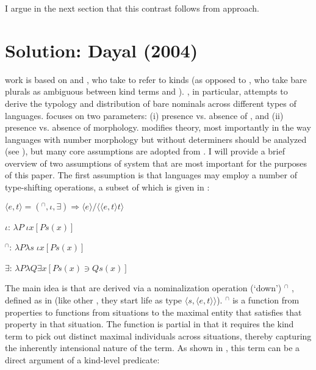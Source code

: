\documentclass[output=paper,
modfonts
]{langscibook}
\begin{document}
	I argue in the next section that this contrast follows from  approach.
	
	\section{Solution: Dayal (2004)} \label{sec:despic:3} 
	
	 work is based on \citet{Chierchia1998} and \citet{Carlson1977}, who take   to refer to kinds (as opposed to \citealt{Wilkinson1991, Diesing1992, KrifkaGerstnerLink1993, Kratzer1995}, who take bare plurals as ambiguous between kind terms and ). \citet{Chierchia1998}, in particular, attempts to derive the typology and distribution of bare nominals across different types of languages. \citet{Chierchia1998} focuses on two parameters: (i) presence vs. absence of , and (ii) presence vs. absence of  morphology. \citet{Dayal2004}
	modifies  theory, most importantly in the way languages with number
	morphology but without determiners should be analyzed (see ), but many core assumptions are adopted from \citet{Chierchia1998}. I will provide a brief overview of two assumptions of  system that are most important for the purposes of this paper. The first assumption is that languages may employ a number of type-shifting operations, a subset of
	which is given in :
	
	\ea \label{ex:despic:23}
	\ea \label{ex:despic:23a}
	$\langle e,t\rangle=(^\cap,\iota,\exists)\Rightarrow\langle e\rangle/\langle\langle e,t\rangle t\rangle$ 
	
	\ex \label{ex:despic:23b}
	$\iota$: \hfill $\lambda P\;\iota x[Ps(x)]$\hspace{75pt}
	
	\ex \label{ex:despic:23c}
	$^\cap$: \hfill $\lambda P\lambda s\;\iota x[Ps(x)]$\hspace{75pt}
	
	\ex \label{ex:despic:23d}
	$\exists$: \hfill $\lambda P\lambda Q\exists x[Ps(x) \ni Qs(x)]$\hspace{75pt}
	
	\z
	\sn \citep[413]{Dayal2004}
	\z 
	
	The main idea is that   are derived via a nominalization operation (`down') $^\cap$ , defined as in  (like other , they start life as type $\langle s, \langle e, t\rangle\rangle$). $^\cap$ is a function from properties to functions from situations to the maximal entity that satisfies that property in
	that situation. The function is partial in that it requires the kind term to pick out distinct maximal individuals across situations, thereby capturing the inherently intensional nature of the term. As shown in , this term can be a direct argument of a kind-level predicate:
	
\end{document}
